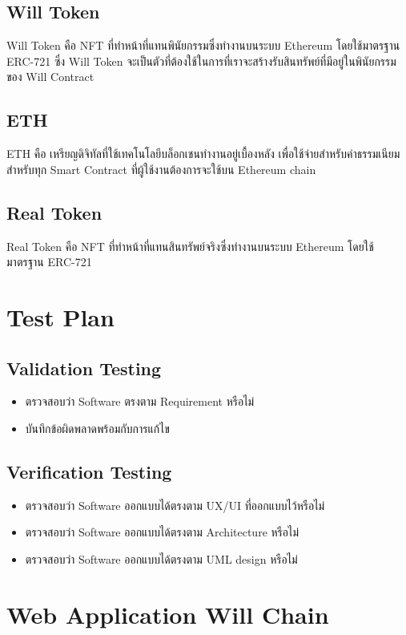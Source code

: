 \documentclass[12pt,oneside,openright,a4paper]{cpe-thai-project}
\begin{document}
\subsection{Will Token}
		\tab  Will Token คือ NFT ที่ทำหน้าที่แทนพินัยกรรมซึ่งทำงานบนระบบ Ethereum โดยใช้มาตรฐาน ERC-721 ซึ่ง Will Token จะเป็นตัวที่ต้องใช้ในการที่เราจะสร้างรับสินทรัพย์ที่มีอยู่ในพินัยกรรมของ Will Contract

\subsection{ETH}
		\tab  ETH คือ เหรียญดิจิทัลที่ใช้เทคโนโลยีบล็อกเชนทำงานอยู่เบื้องหลัง เพื่อใช้จ่ายสำหรับค่าธรรมเนียม สำหรับทุก Smart Contract ที่ผู้ใช้งานต้องการจะใช้บน Ethereum chain
\clearpage
\subsection{Real Token}	
		\tab Real Token คือ NFT ที่ทำหน้าที่แทนสินทรัพย์จริงซึ่งทำงานบนระบบ Ethereum โดยใช้มาตรฐาน ERC-721 
\section{Test Plan}

\subsection {Validation Testing }
	\begin{itemize}
		\item ตรวจสอบว่า Software ตรงตาม Requirement หรือไม่
		\item บันทึกข้อผิดพลาดพร้อมกับการแก้ไข
	\end{itemize}
\subsection {Verification Testing }
	\begin{itemize}
		\item  ตรวจสอบว่า Software ออกแบบได้ตรงตาม UX/UI ที่ออกแบบไว้หรือไม่
		\item ตรวจสอบว่า Software ออกแบบได้ตรงตาม Architecture หรือไม่
		\item ตรวจสอบว่า Software ออกแบบได้ตรงตาม UML design หรือไม่
	\end{itemize}
\clearpage

\section{Web Application Will Chain}
\end{document}
